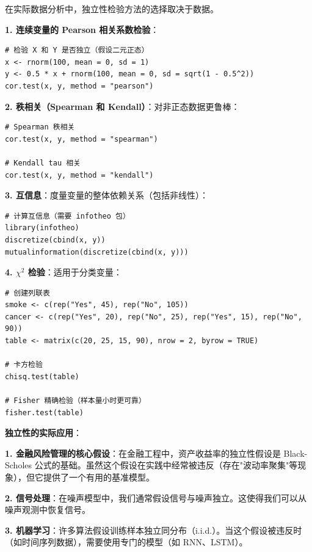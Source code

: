 \begin{example}[独立性检验的更多方法]\label{ex:independence-tests-more-ch2}
在实际数据分析中，独立性检验方法的选择取决于数据。

\textbf{1. 连续变量的 Pearson 相关系数检验}：
\begin{verbatim}
# 检验 X 和 Y 是否独立（假设二元正态）
x <- rnorm(100, mean = 0, sd = 1)
y <- 0.5 * x + rnorm(100, mean = 0, sd = sqrt(1 - 0.5^2))
cor.test(x, y, method = "pearson")
\end{verbatim}

\textbf{2. 秩相关（Spearman 和 Kendall）}：对非正态数据更鲁棒：
\begin{verbatim}
# Spearman 秩相关
cor.test(x, y, method = "spearman")

# Kendall tau 相关
cor.test(x, y, method = "kendall")
\end{verbatim}

\textbf{3. 互信息}：度量变量的整体依赖关系（包括非线性）：
\begin{verbatim}
# 计算互信息（需要 infotheo 包）
library(infotheo)
discretize(cbind(x, y))
mutualinformation(discretize(cbind(x, y)))
\end{verbatim}

\textbf{4. $\chi^2$ 检验}：适用于分类变量：
\begin{verbatim}
# 创建列联表
smoke <- c(rep("Yes", 45), rep("No", 105))
cancer <- c(rep("Yes", 20), rep("No", 25), rep("Yes", 15), rep("No", 90))
table <- matrix(c(20, 25, 15, 90), nrow = 2, byrow = TRUE)

# 卡方检验
chisq.test(table)

# Fisher 精确检验（样本量小时更可靠）
fisher.test(table)
\end{verbatim}
\end{example}

\textbf{独立性的实际应用}：

\textbf{1. 金融风险管理的核心假设}：在金融工程中，资产收益率的独立性假设是 Black-Scholes 公式的基础。虽然这个假设在实践中经常被违反（存在"波动率聚集"等现象），但它提供了一个有用的基准模型。

\textbf{2. 信号处理}：在噪声模型中，我们通常假设信号与噪声独立。这使得我们可以从噪声观测中恢复信号。

\textbf{3. 机器学习}：许多算法假设训练样本独立同分布（i.i.d.）。当这个假设被违反时（如时间序列数据），需要使用专门的模型（如 RNN、LSTM）。
